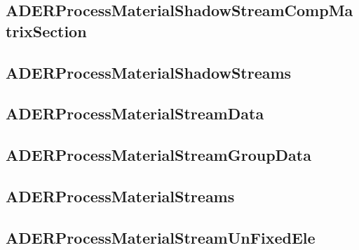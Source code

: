 \subsection{ADERProcessMaterialShadowStreamCompMatrixSection}


\subsection{ADERProcessMaterialShadowStreams}


\subsection{ADERProcessMaterialStreamData}


\subsection{ADERProcessMaterialStreamGroupData}


\subsection{ADERProcessMaterialStreams}


\subsection{ADERProcessMaterialStreamUnFixedEle}

